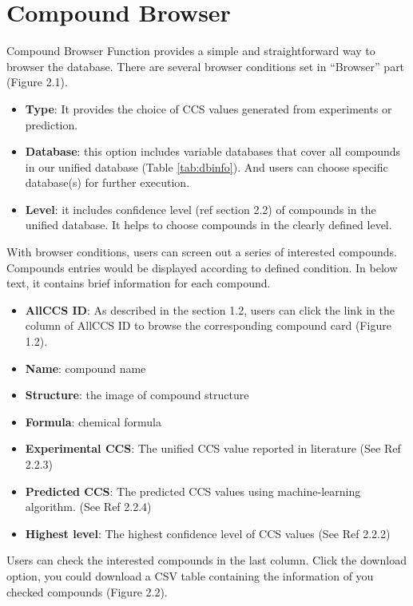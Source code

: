 \documentclass[12pt,]{book}
\providecommand{\tightlist}{%
  \setlength{\itemsep}{0pt}\setlength{\parskip}{0pt}}
\theoremstyle{definition}
\theoremstyle{definition}
\theoremstyle{definition}
\theoremstyle{remark}
\begin{document}
\section{Compound Browser}\label{compound-browser}

Compound Browser Function provides a simple and straightforward way to
browser the database. There are several browser conditions set in
``Browser'' part (Figure 2.1).

\begin{itemize}
\tightlist
\item
  \textbf{Type}: It provides the choice of CCS values generated from
  experiments or prediction.
\item
  \textbf{Database}: this option includes variable databases that cover
  all compounds in our unified database (Table \ref{tab:dbinfo}). And
  users can choose specific database(s) for further execution.
\item
  \textbf{Level}: it includes confidence level (ref section 2.2) of
  compounds in the unified database. It helps to choose compounds in the
  clearly defined level.
\end{itemize}

With browser conditions, users can screen out a series of interested
compounds. Compounds entries would be displayed according to defined
condition. In below text, it contains brief information for each
compound.

\begin{itemize}
\tightlist
\item
  \textbf{AllCCS ID}: As described in the section 1.2, users can click
  the link in the column of AllCCS ID to browse the corresponding
  compound card (Figure 1.2).
\item
  \textbf{Name}: compound name
\item
  \textbf{Structure}: the image of compound structure
\item
  \textbf{Formula}: chemical formula
\item
  \textbf{Experimental CCS}: The unified CCS value reported in
  literature (See Ref 2.2.3)
\item
  \textbf{Predicted CCS}: The predicted CCS values using
  machine-learning algorithm. (See Ref 2.2.4)
\item
  \textbf{Highest level}: The highest confidence level of CCS values
  (See Ref 2.2.2)
\end{itemize}

Users can check the interested compounds in the last column. Click the
download option, you could download a CSV table containing the
information of you checked compounds (Figure 2.2).
\end{document}
